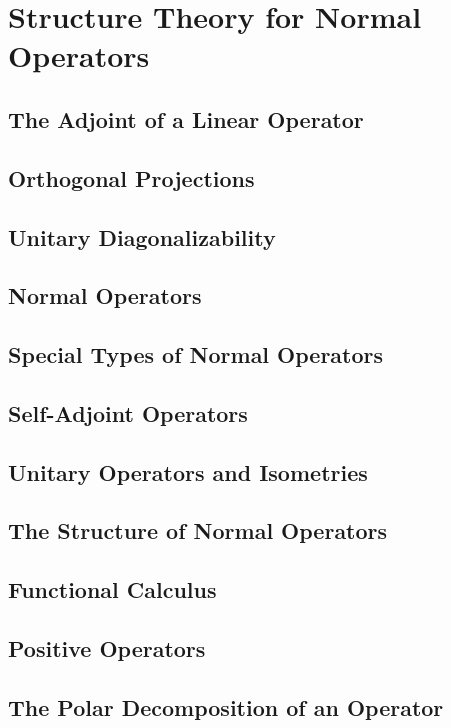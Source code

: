 \chapter{Structure Theory for Normal Operators}
\section{The Adjoint of a Linear Operator}
\section{Orthogonal Projections}
\section{Unitary Diagonalizability}
\section{Normal Operators}
\section{Special Types of Normal Operators}
\section{Self-Adjoint Operators}
\section{Unitary Operators and Isometries}
\section{The Structure of Normal Operators}
\section{Functional Calculus}
\section{Positive Operators}
\section{The Polar Decomposition of an Operator}
